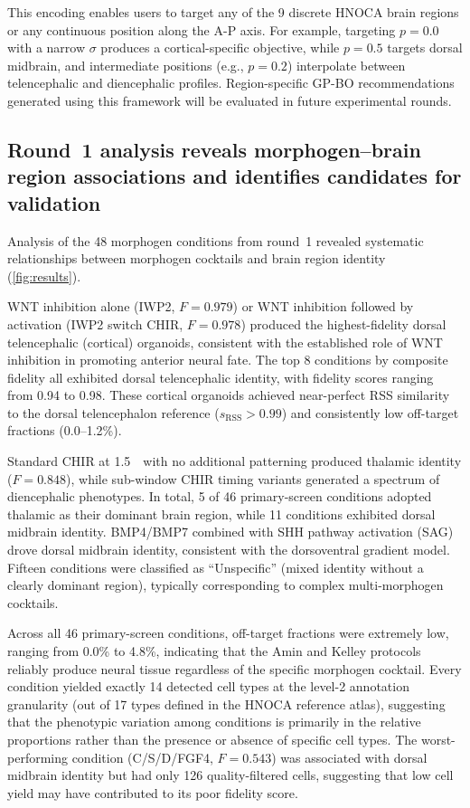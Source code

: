 \documentclass[times,twoside]{zHenriquesLab-StyleBioRxiv}
\begin{document}
This encoding enables users to target any of the 9 discrete HNOCA brain regions or any continuous position along the A-P axis. For example, targeting $p{=}0.0$ with a narrow $\sigma$ produces a cortical-specific objective, while $p{=}0.5$ targets dorsal midbrain, and intermediate positions (e.g., $p{=}0.2$) interpolate between telencephalic and diencephalic profiles. Region-specific GP-BO recommendations generated using this framework will be evaluated in future experimental rounds.

\subsection*{Round~1 analysis reveals morphogen--brain region associations and identifies candidates for validation}

Analysis of the 48 morphogen conditions from round~1 revealed systematic relationships between morphogen cocktails and brain region identity (\cref{fig:results}).

WNT inhibition alone (IWP2, $F{=}0.979$) or WNT inhibition followed by activation (IWP2 switch CHIR, $F{=}0.978$) produced the highest-fidelity dorsal telencephalic (cortical) organoids, consistent with the established role of WNT inhibition in promoting anterior neural fate. The top 8 conditions by composite fidelity all exhibited dorsal telencephalic identity, with fidelity scores ranging from 0.94 to 0.98. These cortical organoids achieved near-perfect RSS similarity to the dorsal telencephalon reference ($s_\text{RSS} > 0.99$) and consistently low off-target fractions (0.0--1.2\%).

Standard CHIR at 1.5\,\si{\micro\Molar} with no additional patterning produced thalamic identity ($F{=}0.848$), while sub-window CHIR timing variants generated a spectrum of diencephalic phenotypes. In total, 5 of 46 primary-screen conditions adopted thalamic as their dominant brain region, while 11 conditions exhibited dorsal midbrain identity. BMP4/BMP7 combined with SHH pathway activation (SAG) drove dorsal midbrain identity, consistent with the dorsoventral gradient model. Fifteen conditions were classified as ``Unspecific'' (mixed identity without a clearly dominant region), typically corresponding to complex multi-morphogen cocktails.

Across all 46 primary-screen conditions, off-target fractions were extremely low, ranging from 0.0\% to 4.8\%, indicating that the Amin and Kelley protocols reliably produce neural tissue regardless of the specific morphogen cocktail. Every condition yielded exactly 14 detected cell types at the level-2 annotation granularity (out of 17 types defined in the HNOCA reference atlas), suggesting that the phenotypic variation among conditions is primarily in the relative proportions rather than the presence or absence of specific cell types. The worst-performing condition (C/S/D/FGF4, $F{=}0.543$) was associated with dorsal midbrain identity but had only 126 quality-filtered cells, suggesting that low cell yield may have contributed to its poor fidelity score.
\end{document}
